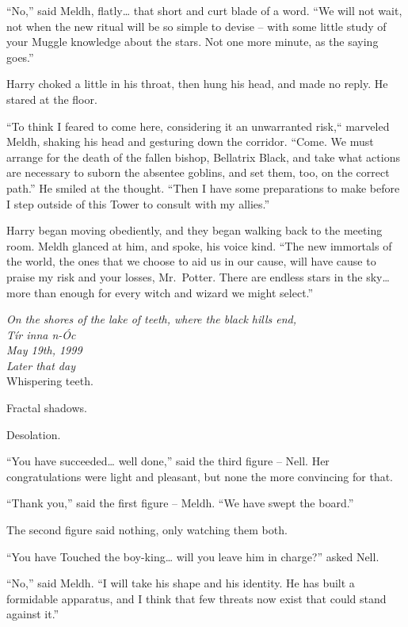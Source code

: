 ``No,'' said Meldh, flatly\ldots{} that short and curt blade of a word.
``We will not wait, not when the new ritual will be so simple to devise
-- with some little study of your Muggle knowledge about the stars. Not
one more minute, as the saying goes.''

Harry choked a little in his throat, then hung his head, and made no
reply. He stared at the floor.

``To think I feared to come here, considering it an unwarranted risk,``
marveled Meldh, shaking his head and gesturing down the corridor.
``Come. We must arrange for the death of the fallen bishop, Bellatrix
Black, and take what actions are necessary to suborn the absentee
goblins, and set them, too, on the correct path.'' He smiled at the
thought. ``Then I have some preparations to make before I step outside
of this Tower to consult with my allies.''

Harry began moving obediently, and they began walking back to the
meeting room. Meldh glanced at him, and spoke, his voice kind. ``The new
immortals of the world, the ones that we choose to aid us in our cause,
will have cause to praise my risk and your losses, Mr.~Potter. There are
endless stars in the sky\ldots{} more than enough for every witch and
wizard we might select.''

\bigskip
\mybreak
\pagebreak

\emph{On the shores of the lake of teeth, where the black hills end,\\
Tír inna n-Óc}\\
\emph{May 19th, 1999}\\
\emph{Later that day}\\

Whispering teeth.

Fractal shadows.

Desolation.

``You have succeeded\ldots{} well done,'' said the third figure -- Nell.
Her congratulations were light and pleasant, but none the more
convincing for that.

``Thank you,'' said the first figure -- Meldh. ``We have swept the
board.''

The second figure said nothing, only watching them both.

``You have Touched the boy-king\ldots{} will you leave him in charge?''
asked Nell.

``No,'' said Meldh. ``I will take his shape and his identity. He has
built a formidable apparatus, and I think that few threats now exist
that could stand against it.''

